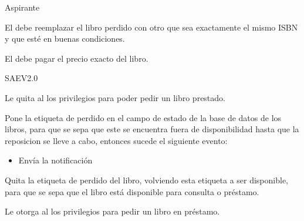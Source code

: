 \begin{PDescripcion}

  \Ppaso Aspirante

    \begin{enumerate}

      \Ppaso[\itarea]  El  debe reemplazar el libro perdido con otro que sea exactamente el mismo ISBN y que esté en buenas condiciones.

      \Ppaso[\itarea]  El  debe pagar el precio exacto del libro.


    \end{enumerate}

  \Ppaso SAEV2.0

    \begin{enumerate}

      \Ppaso[\itarea]  Le quita al  los privilegios para poder pedir un libro prestado.

      \Ppaso[\itarea]  Pone la etiqueta de perdido en el campo de estado de la base de datos de los libros, para que se sepa que este se encuentra fuera de disponibilidad hasta que la reposicion se lleve a cabo, entonces sucede el siguiente evento:
      \begin{itemize}
    \item Envía la notificación 
      \end{itemize}

      \Ppaso[\itarea]  Quita la etiqueta de perdido del libro, volviendo esta etiqueta a ser disponible, para que se sepa que el libro está disponible para consulta o préstamo.

      \Ppaso[\itarea]  Le otorga al  los privilegios para pedir un libro en préstamo.


    \end{enumerate}

\end{PDescripcion}